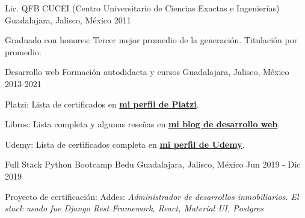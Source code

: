 


\begin{cventries}
  \cventry
    {Lic. QFB}
    {CUCEI (Centro Universitario de Ciencias Exactas e Ingenierías)}
    {Guadalajara, Jalisco, México}
    {2011}
    {
      \begin{cvitems}
        \item {Graduado con honores: Tercer mejor promedio de la generación. Titulación por promedio.}
      \end{cvitems}
    }

    \cventry
    {Desarrollo web}
    {Formación autodidacta y cursos}
    {Guadalajara, Jalisco, México}
    {2013-2021}
    {
      \begin{cvitems}
        \item {Platzi: Lista de certificados en \color{gray} \textbf{\href{https://platzi.com/@eduardo-zepeda/}{mi perfil de Platzi}}.}
        \item {Libros: Lista completa y algunas reseñas en \color{gray} \textbf{ \href{https://coffeebytes.dev/libros-que-he-leido-y-resenas/}{mi blog de desarrollo web}}.}
        \item {Udemy: Lista de certificados completa en \color{gray} \textbf{\href{https://www.udemy.com/user/carlos-eduardo-magallon-zepeda/}{mi perfil de Udemy}}.}
      \end{cvitems}
    }

    \cventry
    {Full Stack Python Bootcamp}
    {Bedu}
    {Guadalajara, Jalisco, México}
    {Jun 2019 - Dic 2019}
    {
      \begin{cvitems}
        \item {Proyecto de certificación: Addes: \textit{Administrador de desarrollos inmobiliarios. El stack usado fue Django Rest Framework, React, Material UI, Postgres}}
      \end{cvitems}
    }
\end{cventries}

